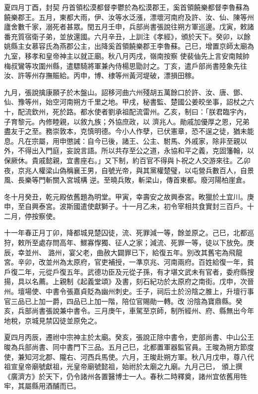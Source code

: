 \begin{pinyinscope}
 夏四月丁酉，封契
 丹首領松漠都督李鬱於為松漠郡王，奚首領饒樂都督李魯蘇為饒樂郡王。五月，東都大雨，伊、汝等水泛漲，漂壞河南府及許、汝、仙、陳等州廬舍數千家，溺死者甚眾。閏五月壬申，兵部尚書張說往朔方軍巡邊。戊寅，敕諸番充質宿衛子弟，並放還國。六月辛丑，上訓注《孝經》，頒於天下。癸卯，以餘姚縣主女慕容氏為燕郡公主，出降奚首領饒樂郡王李魯蘇。己巳，增置京師太廟為九室，移孝和皇帝神主以就正廟。秋八月丙戌，嶺南按察
 使裴伷先上言安南賊帥梅叔鸞等攻圍州縣，遣驃騎將軍兼內侍楊思勖討之。丁亥，遣戶部尚書陸象先往汝、許等州存撫賑給。丙申，博、棣等州黃河堤破，漂損田稼。



 九月，張說擒康願子於木盤山。詔移河曲六州殘胡五萬餘口於許、汝、唐、鄧、仙、豫等州，始空河南朔方千里之地。甲戌，秘書監、楚國公姜皎坐事，詔杖之六十，配流欽州，死於路。都水使者劉承祖配流雷州。乙亥，制曰：「朕君臨宇內，子育黎元。內修睦親，以敘九族；外協庶政，以
 濟兆人。勛戚加優厚之恩，兄弟盡友于之至。務崇敦本，克慎明德。今小人作孽，已伏憲章，恐不逞之徒，猶未能息。凡在宗屬，用申懲誡：自今已後，諸王、公主、駙馬、外戚家，除非至親以外，不得出入門庭，妄說言語。所以共存至公之道，永協和平之義，克固籓翰，以保厥休。貴戚懿親，宜書座右。」又下制，約百官不得與卜祝之人交游來往。乙卯夜，京兆人權梁山偽稱襄王男，自號光帝，與其黨權楚璧，以屯營兵數百人，自景風、長樂等門斬關入宮城構
 逆。至曉兵敗，斬梁山，傳首東都。廢河陽柏崖倉。



 冬十月癸丑，乾元殿依舊題為明堂。甲寅，幸壽安之故興泰宮。畋獵於土宜川。庚申，至自興泰宮。波斯國遣使獻獅子。十一月乙未，初令宰相共食實封三百戶。十二月，停按察使。



 十一年春正月丁卯，降都城見楚囚徒，流、死罪減一等，餘並原之。己巳，北都巡狩，敕所至處存問高年、鰥寡惸獨、征人之家；減流、死罪一等，徒以下放免。庚辰，幸並州、
 潞州，宴父老，曲赦大闢罪已下，給復五年。別改其舊宅為飛龍宮。辛卯，改並州為太原府，官吏補授，一準京兆、河南兩府。百姓給復一年，貧戶復二年，元從戶復五年。武德功臣及元從子孫，有才堪文武未有官者，委府縣搜揚，具以名薦。上親制《起義堂頌》及書，刻石紀功於太原府之南街。戊申，次晉州。壇場使、中書令張嘉貞貶為幽州刺史。壬子，祠后土於汾陰之脽上，升壇行事官三品已上加一爵，四品已上加一階，陪位官賜勛一轉。改
 汾陰為寶鼎縣。癸亥，兵部尚書張說兼中書令。三月庚午，車駕至京師，制所經州、府、縣無出今年地稅，京城見禁囚徒並原免之。



 夏四月丙辰，遷祔中宗神主於太廟。癸亥，張說正除中書令，吏部尚書、中山公王晙為兵部尚書、同中書門下三品。五月己巳，北都置軍器監官員。王晙為朔方節度使，兼知河北郡、隴右、河西兵馬使。六月，王晙赴朔方軍。秋八月戊申，尊八代祖宣皇帝廟號獻祖，光皇帝廟號懿祖，始祔於太廟之九廟。九月己巳，
 頒上撰《廣濟方》於天下，仍令諸州各置醫博士一人。春秋二時釋奠，諸州宜依舊用牲牢，其屬縣用酒酺而已。




\end{pinyinscope}

